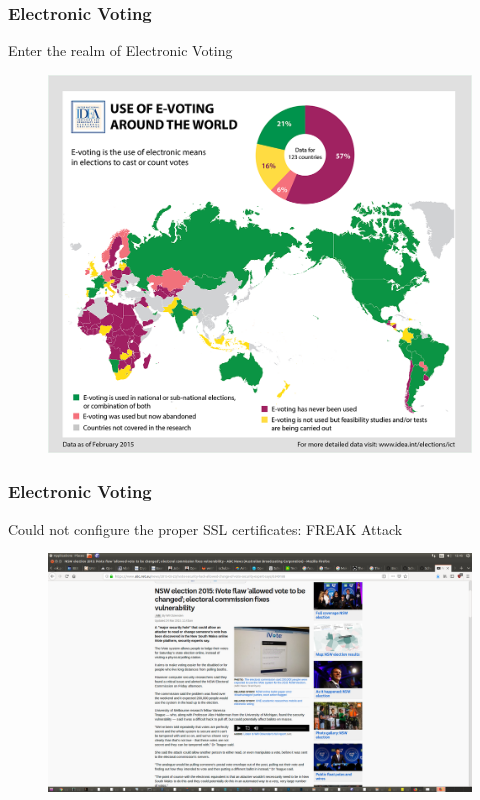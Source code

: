 \documentclass{beamer}
\begin{document}
%

\begin{frame}
\frametitle{Electronic Voting}
{Enter the realm of Electronic Voting}
\begin{figure}
\includegraphics[scale=0.20]{e-voting-map.png}
\end{figure}
\end{frame}


\begin{frame}
\frametitle{Electronic Voting}
{Could not configure the proper SSL certificates: FREAK Attack}
\begin{figure}
\includegraphics[scale=0.20]{Ausvoting.png}
\end{figure}
\end{frame}
\end{document}
